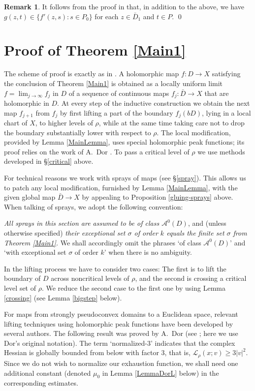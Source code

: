 \documentclass[11pt]{amsart}
\numberwithin{equation}{section}
\theoremstyle{definition}
\newtheorem{remark}[theorem]{Remark}
\begin{document}
\begin{remark}
It follows from the proof in \cite{BDF1} that, in addition to the above, we have
$g(z,t)\in\{f'(z,s)\colon s \in P_0\}$ for each $z\in \bar D_1$ and $t\in P$.
\qed \end{remark}

\section{Proof of Theorem \ref{Main1}}
\label{proof}
The scheme of proof is exactly as in \cite[proof of Theorem 1.1]{BDF1}.
A holomorphic map $f\colon D\to X$ satisfying the conclusion 
of Theorem \ref{Main1} is obtained as a locally uniform limit 
$f=\lim_{j\to \infty} f_j$ in $D$ of a sequence of continuous maps 
$f_j\colon \bar D\to X$  that are holomorphic in $D$. 
At every step of the inductive construction 
we obtain the next map $f_{j+1}$ from $f_j$
by first lifting a  part of the boundary $f_j(bD)$,
lying in a local chart of $X$, to higher levels
of $\rho$, while at the same time  taking care not to drop 
the boundary substantially lower with respect to $\rho$.
The local modification, provided by Lemma \ref{MainLemma},
uses special holomorphic peak functions;
its proof  relies on the work of A.\ Dor \cite{Dor1}.
To pass a critical level of $\rho$ we use methods 
developed in \S\ref{critical} above. 

For technical reasons we work with sprays of maps (see \S\ref{spray}). 
This allows us to patch any local modification, furnished by 
Lemma \ref{MainLemma}, with the given global map $\bar D\to X$  by 
appealing to Proposition \ref{gluing-sprays} above.
When talking of sprays, we adopt the following convention:

{\em All sprays in this section are assumed to be of class ${\mathcal{A}}^0(D)$}, 
and (unless otherwise specified) 
{\em their exceptional set $\sigma$ of order $k$ 
equals the finite set $\sigma$ from Theorem \ref{Main1}.} 
We shall accordingly omit the phrases `of class ${\mathcal{A}}^0(D)$' and 
`with exceptional set $\sigma$ of order $k$' 
when there is no ambiguity.

In the lifting process we have to consider two cases: 
The first is to lift the boundary of $D$ across noncritical 
levels of $\rho$, and the second is crossing a critical 
level set of $\rho$. We reduce the second case to the first 
one by using Lemma \ref{crossing}
(see Lemma \ref{bigstep} below).

For maps from strongly pseudoconvex domains to a 
Euclidean space, relevant lifting techniques using holomorphic peak functions
have been developed by several authors. The following result was proved by
A.\ Dor (see \cite[Lemma 1]{Dor1}; here we use Dor's original notation).
The term `normalized-3' indicates that the complex Hessian is 
globally bounded from below with factor $3$, that is, 
${\mathcal{L}}_\rho(x;v)\ge 3|v|^2$. Since we do not wish to
normalize our exhaustion function, we shall need one 
additional constant (denoted $\mu_0$ in Lemma \ref{LemmaDorL} below)
in the corresponding estimates.
\end{document}
